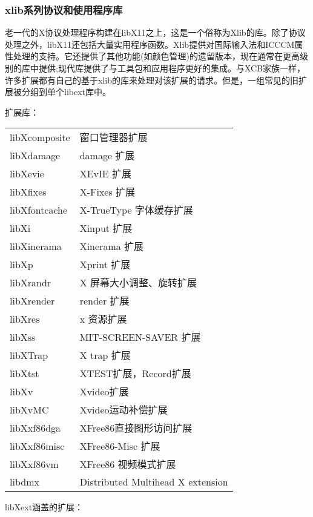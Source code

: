 \subsubsection{xlib系列协议和使用程序库}

老一代的X协议处理程序构建在libX11之上，这是一个俗称为Xlib的库。除了协议处理之外，libX11还包括大量实用程序函数。Xlib提供对国际输入法和ICCCM属性处理的支持。它还提供了其他功能(如颜色管理)的遗留版本，现在通常在更高级别的库中提供;现代库提供了与工具包和应用程序更好的集成。与XCB家族一样，许多扩展都有自己的基于xlib的库来处理对该扩展的请求。但是，一组常见的旧扩展被分组到单个libext库中。

\noindent 扩展库：

\begin{center}
\begin{supertabular}{|l|l|}
	libXcomposite & 窗口管理器扩展\\
	libXdamage & damage 扩展\\
	libXevie & XEvIE 扩展\\
	libXfixes & X-Fixes 扩展\\
	libXfontcache & X-TrueType 字体缓存扩展\\
	libXi & Xinput 扩展\\
	libXinerama & Xinerama 扩展\\
	libXp & Xprint 扩展\\
	libXrandr & X 屏幕大小调整、旋转扩展\\
	libXrender & render 扩展\\
	libXres & x 资源扩展\\
	libXss & MIT-SCREEN-SAVER 扩展\\
	libXTrap & X trap 扩展\\
	libXtst & XTEST扩展，Record扩展\\
	libXv & Xvideo扩展\\
	libXvMC & Xvideo运动补偿扩展\\
	libXxf86dga & XFree86直接图形访问扩展\\
	libXxf86misc & XFree86-Misc 扩展\\
	libXxf86vm & XFree86 视频模式扩展\\
	libdmx & Distributed Multihead X extension\\
	\hline
\end{supertabular}
\end{center}

\noindent libXext涵盖的扩展：

